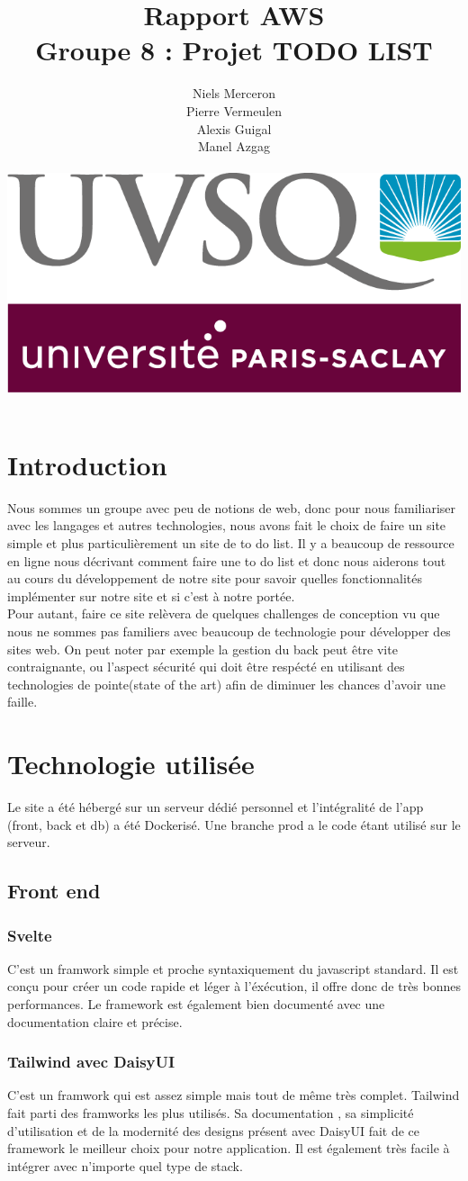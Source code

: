 \documentclass[a4paper,12pt]{report}
\date{}
\title{Rapport AWS \\ Groupe 8 : Projet TODO LIST}
\author{Niels Merceron \\ Pierre Vermeulen \\ Alexis Guigal \\ Manel Azgag \\ \\  \includegraphics[scale=0.20]{logo-UVSQ-2020-RVB.png}}
\begin{document}
\maketitle

\newpage
\tableofcontents
\chapter{Introduction}

Nous sommes un groupe avec peu de notions de web, donc pour nous familiariser avec les langages et autres technologies, nous avons fait le choix de faire un site simple et plus particulièrement un site de to do list.
Il y a beaucoup de ressource en ligne nous décrivant comment faire une to do list et donc nous aiderons tout au cours du développement de notre site pour savoir quelles fonctionnalités implémenter sur notre site et si c'est à notre portée.
\\Pour autant, faire ce site relèvera de quelques challenges de conception vu que nous ne sommes pas familiers avec beaucoup de technologie pour développer des sites web.
On peut noter par exemple la gestion du back peut être vite contraignante, ou l'aspect sécurité qui doit être respécté en utilisant des technologies de pointe(state of the art) afin de diminuer les chances d'avoir une faille.


\chapter{Technologie utilisée}
Le site a été hébergé sur un serveur dédié personnel et l'intégralité de l'app (front, back et db) a été Dockerisé. Une branche prod a le code étant utilisé sur le serveur.
\section{Front end}

\subsection{Svelte}
C'est un framwork simple et proche syntaxiquement du javascript standard. Il est conçu pour créer un code rapide et léger à l'éxécution, il offre donc de très bonnes performances. 
Le framework est également bien documenté avec une documentation claire et précise.

\subsection{Tailwind avec DaisyUI}
C'est un framwork qui est assez simple mais tout de même très complet. Tailwind fait parti des framworks les plus utilisés. 
Sa documentation , sa simplicité d'utilisation et de la modernité des designs présent avec DaisyUI fait de ce framework le meilleur choix pour notre application.
Il est également très facile à intégrer avec n'importe quel type de stack.
\end{document}
